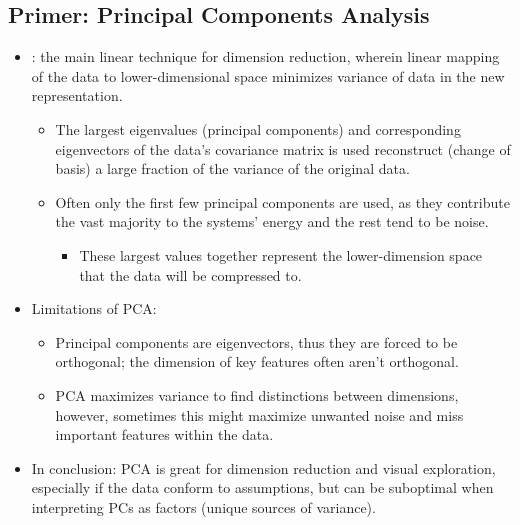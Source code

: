 \begin{itemize}
  \subsection{Primer: Principal Components Analysis}
  \begin{itemize}
    \item {}: the main linear technique for dimension reduction, wherein linear mapping of the data to lower-dimensional space minimizes variance of data in the new representation.
      \begin{itemize}
        \item The largest eigenvalues (principal components) and corresponding eigenvectors of the data's covariance matrix is used reconstruct (change of basis) a large fraction of the variance of the original data.
        \item Often only the first few principal components are used, as they contribute the vast majority to the systems' energy and the rest tend to be noise.
          \begin{itemize}
            \item These largest values together represent the lower-dimension space that the data will be compressed to.
          \end{itemize}
      \end{itemize}
    \item Limitations of PCA\@:
      \begin{itemize}
        \item Principal components are eigenvectors, thus they are forced to be orthogonal; the dimension of key features often aren't orthogonal.
        \item PCA maximizes variance to find distinctions between dimensions, however, sometimes this might maximize unwanted noise and miss important features within the data.
      \end{itemize}
    \item In conclusion: PCA is great for dimension reduction and visual exploration, especially if the data conform to assumptions, but can be suboptimal when interpreting PCs as factors (unique sources of variance).
  \end{itemize}
    

\end{itemize}

